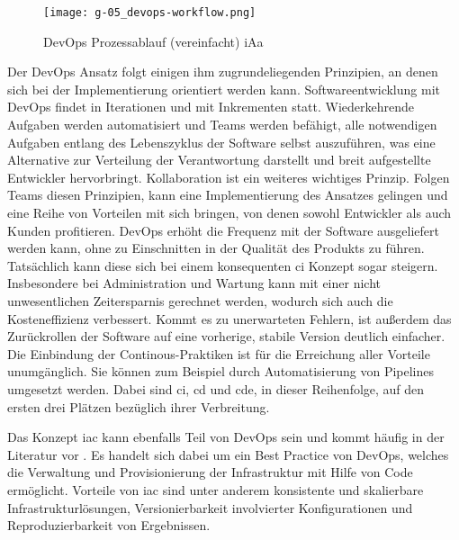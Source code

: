 \begin{figure}[h]
    \centering
    \texttt{[image: g-05\_devops-workflow.png]}
    \caption{DevOps Prozessablauf (vereinfacht) \acrshort{iAa} \citeauthor{008:GitOps-Approach-to-Cloud-Cluster-System-Deployment}}
    \label{fig:g-05_devops-workflow}
\end{figure}

Der DevOps Ansatz folgt einigen ihm zugrundeliegenden Prinzipien, an denen sich bei der Implementierung orientiert werden kann. Softwareentwicklung mit DevOps findet in Iterationen und mit Inkrementen statt. Wiederkehrende Aufgaben werden automatisiert und Teams werden befähigt, alle notwendigen Aufgaben entlang des Lebenszyklus der Software selbst auszuführen, was eine Alternative zur Verteilung der Verantwortung darstellt und breit aufgestellte Entwickler hervorbringt. Kollaboration ist ein weiteres wichtiges Prinzip. \cite{009:GitOps-Evolution-of-DevOps} Folgen Teams diesen Prinzipien, kann eine Implementierung des Ansatzes gelingen und eine Reihe von Vorteilen mit sich bringen, von denen sowohl Entwickler als auch Kunden profitieren. DevOps erhöht die Frequenz mit der Software ausgeliefert werden kann, ohne zu Einschnitten in der Qualität des Produkts zu führen. Tatsächlich kann diese sich bei einem konsequenten \Gls{ci} Konzept sogar steigern. Insbesondere bei Administration und Wartung kann mit einer nicht unwesentlichen Zeitersparnis gerechnet werden, wodurch sich auch die Kosteneffizienz verbessert. Kommt es zu unerwarteten Fehlern, ist außerdem das Zurückrollen der Software auf eine vorherige, stabile Version deutlich einfacher. Die Einbindung der Continous-Praktiken ist für die Erreichung aller Vorteile unumgänglich. Sie können zum Beispiel durch Automatisierung von Pipelines umgesetzt werden. Dabei sind \acrfull{ci}, \acrfull{cd} und \acrfull{cde}, in dieser Reihenfolge, auf den ersten drei Plätzen bezüglich ihrer Verbreitung. \cite{001:DevOps-Adoption-in-Software-Development}

Das Konzept \Gls{iac} kann ebenfalls Teil von DevOps sein und kommt häufig in der Literatur vor \cite{001:DevOps-Adoption-in-Software-Development}. Es handelt sich dabei um ein Best Practice von DevOps, welches die Verwaltung und Provisionierung der Infrastruktur mit Hilfe von Code ermöglicht. Vorteile von \Gls{iac} sind unter anderem konsistente und skalierbare Infrastrukturlösungen, Versionierbarkeit involvierter Konfigurationen und Reproduzierbarkeit von Ergebnissen. \cite{012:Compare-and-Contrast-various-Software-Development-Methodologies}

